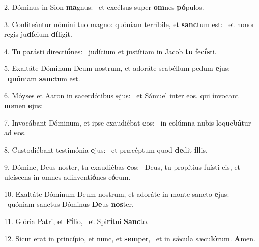2. Dóminus in Sion \textbf{ma}gnus: \ast\  et excélsus super \textbf{om}nes \textbf{pó}pulos.\

3. Confiteántur nómini tuo magno: quóniam terríbile, et \textbf{sanc}tum est: \ast\  et honor regis ju\textbf{dí}cium \textbf{dí}ligit.\

4. Tu parásti directi\textbf{ó}nes: \ast\  judícium et justítiam in Jacob \textbf{tu} fe\textbf{cís}ti.\

5. Exaltáte Dóminum Deum nostrum, et adoráte scabéllum pedum \textbf{e}jus: \ast\  \textbf{quón}iam \textbf{sanc}tum est.\

6. Móyses et Aaron in sacerdótibus \textbf{e}jus: \ast\  et Sámuel inter eos, qui ínvocant \textbf{no}men \textbf{e}jus:\

7. Invocábant Dóminum, et ipse exaudiébat \textbf{e}os: \ast\  in colúmna nubis loque\textbf{bá}tur ad \textbf{e}os.\

8. Custodiébant testimónia \textbf{e}jus: \ast\  et præcéptum quod \textbf{de}dit \textbf{il}lis.\

9. Dómine, Deus noster, tu exaudiébas \textbf{e}os: \ast\  Deus, tu propítius fuísti eis, et ulcíscens in omnes adinventi\textbf{ó}nes e\textbf{ó}rum.\

10. Exaltáte Dóminum Deum nostrum, et adoráte in monte sancto \textbf{e}jus: \ast\  quóniam sanctus Dóminus \textbf{De}us \textbf{nos}ter.\

11. Glória Patri, et \textbf{Fí}lio, \ast\  et Spi\textbf{rí}tui \textbf{Sanc}to.\

12. Sicut erat in princípio, et nunc, et \textbf{sem}per, \ast\  et in sǽcula sæcu\textbf{ló}rum. \textbf{A}men.\

